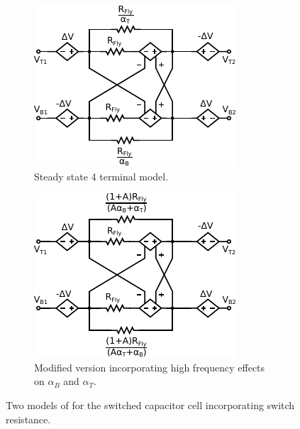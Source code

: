 		
	\begin{figure}
		\centering
		\begin{subfigure}{0.45\linewidth}
			\includegraphics[width=\linewidth]{4Terminal/Figures/CellRes_FSL.pdf}
			\caption{Steady state 4 terminal model.}
			\label{fig:cellresfsl}
		\end{subfigure}
		\hfill
		\begin{subfigure}{0.45\linewidth}
			\includegraphics[width=\linewidth]{4Terminal/Figures/CellRes_FSL_3.pdf}
			\caption{Modified version incorporating high frequency effects on $\alpha_B$ and $\alpha_T$.}
			\label{fig:cellresfsl_3}
		\end{subfigure}
		\caption{Two models of for the switched capacitor cell incorporating switch resistance.}
		
	\end{figure}
	
